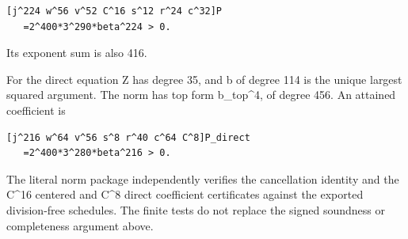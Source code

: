 \begin{verbatim}
[j^224 w^56 v^52 C^16 s^12 r^24 c^32]P
   =2^400*3^290*beta^224 > 0.
\end{verbatim}

Its exponent sum is also 416.



For the direct equation Z has degree 35, and b of degree 114 is the unique largest squared argument. The norm has top form b\_\allowbreak{}top\textasciicircum{}\allowbreak{}4, of degree 456. An attained coefficient is



\begin{verbatim}
[j^216 w^64 v^56 s^8 r^40 c^64 C^8]P_direct
   =2^400*3^280*beta^216 > 0.
\end{verbatim}

The literal norm package independently verifies the cancellation identity and the C\textasciicircum{}\allowbreak{}16 centered and C\textasciicircum{}\allowbreak{}8 direct coefficient certificates against the exported division-free schedules. The finite tests do not replace the signed soundness or completeness argument above.
